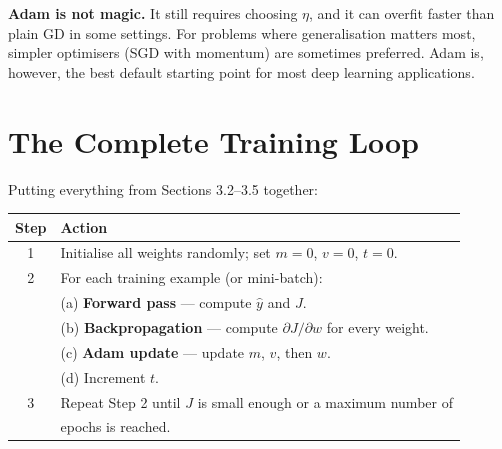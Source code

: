 \documentclass[12pt, a4paper]{article}
\theoremstyle{definition}
\newcommand{\yhat}{\hat{y}}
\begin{document}
\begin{warnbox}
  \textbf{Adam is not magic.}
  It still requires choosing $\eta$, and it can overfit faster than plain GD
  in some settings.  For problems where generalisation matters most, simpler
  optimisers (SGD with momentum) are sometimes preferred.  Adam is, however,
  the best default starting point for most deep learning applications.
\end{warnbox}

\section{The Complete Training Loop}

Putting everything from Sections 3.2--3.5 together:

\vspace{0.5em}
\begin{center}
  \renewcommand{\arraystretch}{1.5}
  \begin{tabular}{cl}
    \toprule
    Step & Action                                                                 \\
    \midrule
    1    & Initialise all weights randomly; set $m = 0$, $v = 0$, $t = 0$.        \\
    2    & For each training example (or mini-batch):                             \\
         & \quad (a) \textbf{Forward pass} --- compute $\yhat$ and $J$.           \\
         & \quad (b) \textbf{Backpropagation} --- compute $\partial J/\partial w$
    for every weight.                                                             \\
         & \quad (c) \textbf{Adam update} --- update $m$, $v$, then $w$.          \\
         & \quad (d) Increment $t$.                                               \\
    3    & Repeat Step 2 until $J$ is small enough or a maximum number of         \\
         & epochs is reached.                                                     \\
    \bottomrule
  \end{tabular}
\end{center}
\end{document}
